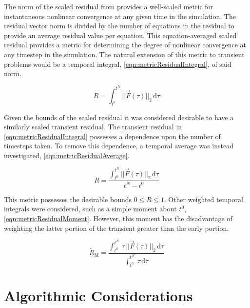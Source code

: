 The norm of the scaled residual from  provides a well-scaled metric for instantaneous nonlinear convergence at any given time in the simulation.
The residual vector norm is divided by the number of equations in the residual to provide an average residual value per equation.
This equation-averaged scaled residual provides a metric for determining the degree of nonlinear convergence at any timestep in the simulation.
The natural extension of this metric to transient problems would be a temporal integral, \eqref{eqn:metricResidualIntegral}, of said norm.

\begin{equation}
\label{eqn:metricResidualIntegral}
R = \int_{t^{0}}^{t^{N}} ||\vec{F}(\tau)||_2 \,\mathrm{d} \tau
\end{equation}

Given the bounds of the scaled residual it was considered desirable to have a similarly scaled transient residual.
The transient residual in \eqref{eqn:metricResidualIntegral} possesses a dependence upon the number of timesteps taken.
To remove this dependence, a temporal average was instead investigated, \eqref{eqn:metricResidualAverage}.

\begin{equation}
\label{eqn:metricResidualAverage}
\tilde{R} = \frac{\int_{t^{0}}^{t^{N}} ||\vec{F}(\tau)||_2 \,\mathrm{d} \tau}{t^{N} - t^{0}}
\end{equation}

This metric possesses the desirable bounds $0 \leq R \leq 1$.
Other weighted temporal integrals were considered, such as a simple moment about $t^{0}$, \eqref{eqn:metricResidualMoment}.
However, this moment has the disadvantage of weighting the latter portion of the transient greater than the early portion.

\begin{equation}
\label{eqn:metricResidualMoment}
\tilde{R}_{\text{M}} = \frac{\int_{t^{0}}^{t^{N}} \,\tau\,||\vec{F}(\tau)||_2 \,\mathrm{d} \tau}{\int_{t^{0}}^{t^{N}} \,\tau \,\mathrm{d} \tau}
\end{equation}

\section{Algorithmic Considerations}
\label{sect:algoConcerns}

